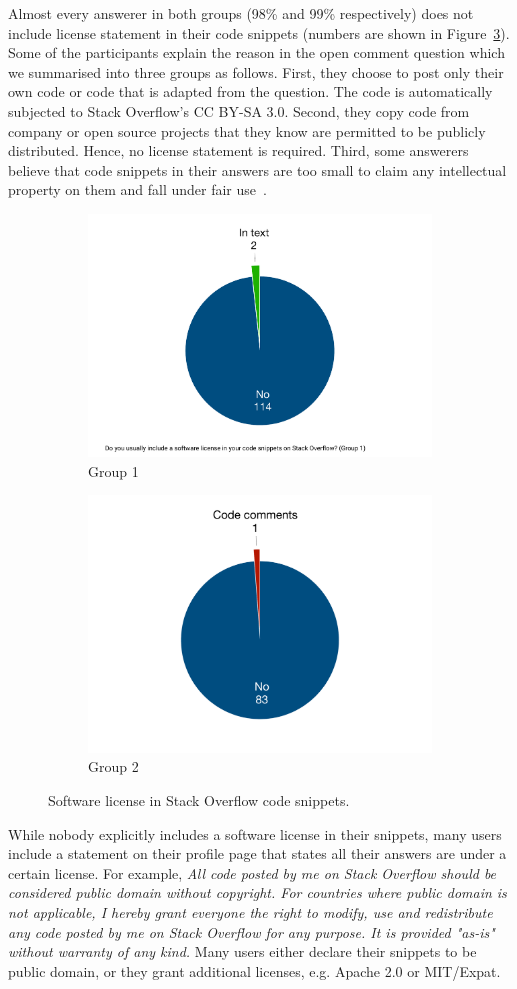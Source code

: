 \documentclass{svjour3}                     %
\begin{document}
Almost every answerer in both groups (98\% and 99\% respectively) does not
include license statement in their code snippets (numbers are shown in
Figure~\ref{fig:survey_license}). Some of the participants explain the reason in
the open comment question which we summarised into three groups as follows.
First, they choose to post only their own code or code that is adapted from the
question. The code is automatically subjected to Stack Overflow's CC BY-SA 3.0.
Second, they copy code from company or open source projects that they know are
permitted to be publicly distributed. Hence, no license statement is required.
Third, some answerers believe that code snippets in their answers are too small
to claim any intellectual property on them and fall under fair
use~\citep{fairuse}.

\begin{figure}
	\begin{subfigure}{.5\textwidth}
		\centering
		\includegraphics[width=.4\linewidth]{survey_license_1}
		\caption{Group 1}
		\label{fig:survey_license_1}
	\end{subfigure}%
	\begin{subfigure}{.5\textwidth}
		\centering
		\includegraphics[width=.4\linewidth]{survey_license_2}
		\caption{Group 2}
		\label{fig:survey_license_2}
	\end{subfigure}
	\caption{Software license in Stack Overflow code snippets.}
	\label{fig:survey_license}
\end{figure}

While nobody explicitly includes a software license in their snippets,
many users include a statement on their profile page that states all their
answers are under a certain license. For example, \textit{All code posted by me on
	Stack Overflow should be considered public domain without copyright. For
	countries where public domain is not applicable, I hereby grant everyone the
	right to modify, use and redistribute any code posted by me on Stack Overflow
	for any purpose. It is provided "as-is" without warranty of any kind.}  Many
users either declare their snippets to be public domain, or they grant
additional licenses, e.g. Apache 2.0 or MIT/Expat.
\end{document}
